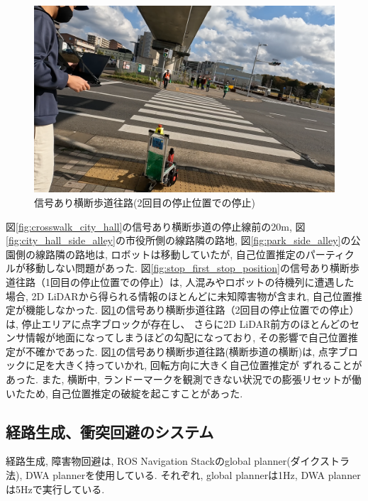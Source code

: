 \documentclass[twocolumn,9pt]{jsproceedings}
\begin{document}
\begin{figure}[h]
  \begin{center}
    \includegraphics[width=1.0\linewidth]{figs/stop_second_stop_position.pdf}
    \caption{信号あり横断歩道往路(2回目の停止位置での停止)}
    \label{fig:stop_second_stop_position}
  \end{center}
\end{figure}

図\ref{fig:crosswalk_city_hall}の信号あり横断歩道の停止線前の20m, 
図\ref{fig:city_hall_side_alley}の市役所側の線路隣の路地, 図\ref{fig:park_side_alley}の公園側の線路隣の路地は, 
ロボットは移動していたが, 自己位置推定のパーティクルが移動しない問題があった. 
図\ref{fig:stop_first_stop_position}の信号あり横断歩道往路（1回目の停止位置での停止）は, 人混みやロボットの待機列に遭遇した
場合, 2D LiDARから得られる情報のほとんどに未知障害物が含まれ, 自己位置推定が機能しなかった. 
図\ref{fig:stop_second_stop_position}の信号あり横断歩道往路（2回目の停止位置での停止）は, 停止エリアに点字ブロックが存在し、
さらに2D LiDAR前方のほとんどのセンサ情報が地面になってしまうほどの勾配になっており, 
その影響で自己位置推定が不確かであった.
図\ref{fig:stop_second_stop_position}の信号あり横断歩道往路(横断歩道の横断)は, 点字ブロックに足を大きく持っていかれ, 回転方向に大きく自己位置推定が
ずれることがあった. 
また, 横断中, ランドーマークを観測できない状況での膨張リセットが働いたため, 自己位置推定の破綻を起こすことがあった. 

\subsection{経路生成、衝突回避のシステム}

経路生成, 障害物回避は, ROS Navigation Stackのglobal planner(ダイクストラ法), DWA plannerを使用している. 
それぞれ, global plannerは1Hz, DWA plannerは5Hzで実行している. 
\end{document}
